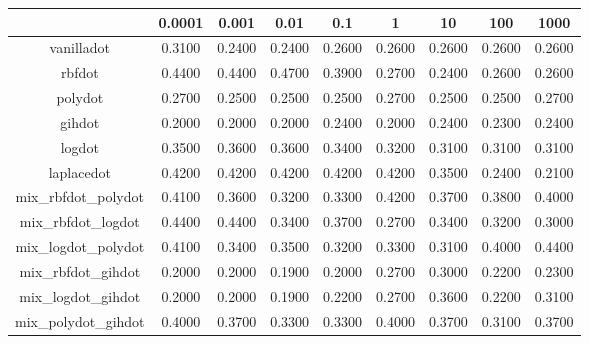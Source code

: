 \begin{table}[ht]
\centering
\begin{tabular}{ccccccccc}
  \hline
 & 0.0001 & 0.001 & 0.01 & 0.1 & 1 & 10 & 100 & 1000 \\ 
  \hline
vanilladot & 0.3100 & 0.2400 & 0.2400 & 0.2600 & 0.2600 & 0.2600 & 0.2600 & 0.2600 \\ 
  rbfdot & 0.4400 & 0.4400 & 0.4700 & 0.3900 & 0.2700 & 0.2400 & 0.2600 & 0.2600 \\ 
  polydot & 0.2700 & 0.2500 & 0.2500 & 0.2500 & 0.2700 & 0.2500 & 0.2500 & 0.2700 \\ 
  gihdot & 0.2000 & 0.2000 & 0.2000 & 0.2400 & 0.2000 & 0.2400 & 0.2300 & 0.2400 \\ 
  logdot & 0.3500 & 0.3600 & 0.3600 & 0.3400 & 0.3200 & 0.3100 & 0.3100 & 0.3100 \\ 
  laplacedot & 0.4200 & 0.4200 & 0.4200 & 0.4200 & 0.4200 & 0.3500 & 0.2400 & 0.2100 \\ 
  mix\_rbfdot\_polydot & 0.4100 & 0.3600 & 0.3200 & 0.3300 & 0.4200 & 0.3700 & 0.3800 & 0.4000 \\ 
  mix\_rbfdot\_logdot & 0.4400 & 0.4400 & 0.3400 & 0.3700 & 0.2700 & 0.3400 & 0.3200 & 0.3000 \\ 
  mix\_logdot\_polydot & 0.4100 & 0.3400 & 0.3500 & 0.3200 & 0.3300 & 0.3100 & 0.4000 & 0.4400 \\ 
  mix\_rbfdot\_gihdot & 0.2000 & 0.2000 & 0.1900 & 0.2000 & 0.2700 & 0.3000 & 0.2200 & 0.2300 \\ 
  mix\_logdot\_gihdot & 0.2000 & 0.2000 & 0.1900 & 0.2200 & 0.2700 & 0.3600 & 0.2200 & 0.3100 \\ 
  mix\_polydot\_gihdot & 0.4000 & 0.3700 & 0.3300 & 0.3300 & 0.4000 & 0.3700 & 0.3100 & 0.3700 \\ 
   \hline
\end{tabular}
\end{table}
